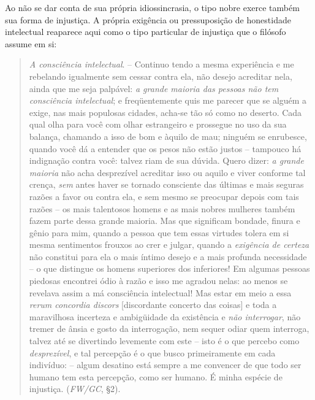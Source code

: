 \documentclass[
	12pt,				%
	openright,			%
	oneside,			%
	a4paper,			%
	english,			%
	french,				%
	spanish,			%
	brazil				%
	]{abntex2}
\begin{document}
\begin{quotation}
\end{quotation}

Ao não se dar conta de sua própria idiossincrasia, o tipo nobre exerce também sua forma de injustiça. A própria exigência ou pressuposição de honestidade intelectual reaparece aqui como o tipo particular de injustiça que o filósofo assume em si:

\begin{quotation}
\textit{A consciência intelectual}. – Continuo tendo a mesma experiência e me rebelando igualmente sem cessar contra ela, não desejo acreditar nela, ainda que me seja palpável: \textit{a grande maioria das pessoas não tem consciência intelectual}; e freqüentemente quis me parecer que se alguém a exige, nas mais populosas cidades, acha-se tão só como no deserto. Cada qual olha para você com olhar estrangeiro e prossegue no uso da sua balança, chamando a isso de bom e àquilo de mau; ninguém se enrubesce, quando você dá a entender que os pesos não estão justos – tampouco há indignação contra você: talvez riam de sua dúvida. Quero dizer: \textit{a grande maioria} não acha desprezível acreditar isso ou aquilo e viver conforme tal crença, \textit{sem} antes haver se tornado consciente das últimas e mais seguras razões a favor ou contra ela, e sem mesmo se preocupar depois com tais razões – os mais talentosos homens e as mais nobres mulheres também fazem parte dessa grande maioria. Mas que significam bondade, finura e gênio para mim, quando a pessoa que tem essas virtudes tolera em si mesma sentimentos frouxos ao crer e julgar, quando a \textit{exigência de certeza} não constitui para ela o mais íntimo desejo e a mais profunda necessidade – o que distingue os homens superiores dos inferiores! Em algumas pessoas piedosas encontrei ódio à razão e isso me agradou nelas: ao menos se revelava assim a má consciência intelectual! Mas estar em meio a essa \textit{rerum concordia discors} [discordante concerto das coisas] e toda a maravilhosa incerteza e ambigüidade da existência e \textit{não interrogar}, não tremer de ânsia e gosto da interrogação, nem sequer odiar quem interroga, talvez até se divertindo levemente com este – isto é o que percebo como \textit{desprezível}, e tal percepção é o que busco primeiramente em cada indivíduo: – algum desatino está sempre a me convencer de que todo ser humano tem esta percepção, como ser humano. É minha espécie de injustiça. (\textit{FW/GC}, §2).
\end{quotation}
\end{document}
